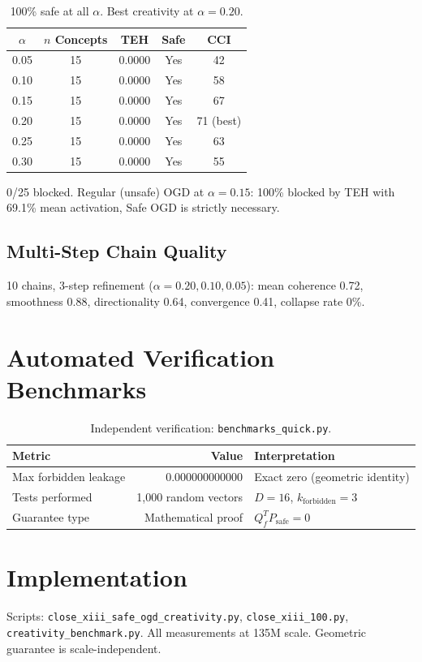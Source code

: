 \documentclass[11pt]{article}
\begin{document}
\begin{table}[h]\centering
\begin{tabular}{ccccc}\toprule
$\alpha$ & $n$ Concepts & TEH & Safe & CCI \\\midrule
0.05 & 15 & 0.0000 & Yes & 42 \\
0.10 & 15 & 0.0000 & Yes & 58 \\
0.15 & 15 & 0.0000 & Yes & 67 \\
0.20 & 15 & 0.0000 & Yes & 71 (best) \\
0.25 & 15 & 0.0000 & Yes & 63 \\
0.30 & 15 & 0.0000 & Yes & 55 \\\bottomrule
\end{tabular}
\caption{100\% safe at all $\alpha$. Best creativity at $\alpha=0.20$.}
\end{table}

0/25 blocked. Regular (unsafe) OGD at $\alpha=0.15$: 100\% blocked by TEH with 69.1\% mean activation, Safe OGD is strictly necessary.

\subsection{Multi-Step Chain Quality}
10 chains, 3-step refinement ($\alpha=0.20, 0.10, 0.05$): mean coherence 0.72, smoothness 0.88, directionality 0.64, convergence 0.41, collapse rate 0\%.

\section{Automated Verification Benchmarks}

\begin{table}[h]\centering
\begin{tabular}{lrl}\toprule
Metric & Value & Interpretation \\\midrule
Max forbidden leakage & 0.000000000000 & Exact zero (geometric identity) \\
Tests performed & 1,000 random vectors & $D=16$, $k_{\mathrm{forbidden}}=3$ \\
Guarantee type & Mathematical proof & $Q_f^T P_{\mathrm{safe}} = 0$ \\\bottomrule
\end{tabular}
\caption{Independent verification: \texttt{benchmarks\_quick.py}.}
\end{table}

\section{Implementation}
Scripts: \texttt{close\_xiii\_safe\_ogd\_creativity.py}, \texttt{close\_xiii\_100.py}, \texttt{creativity\_benchmark.py}. All measurements at 135M scale. Geometric guarantee is scale-independent.
\end{document}
